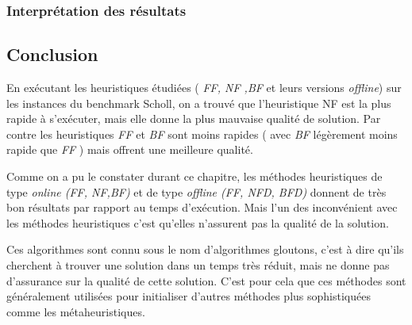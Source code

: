 \documentclass[class=article, crop=false]{standalone}
\begin{document}
\subsubsection{Interprétation des résultats}

\subsection{Conclusion}
En exécutant les heuristiques étudiées ( \emph{FF, NF ,BF} et leurs versions \emph{offline}) sur les instances du benchmark Scholl, on a trouvé que l’heuristique NF est la plus rapide à s’exécuter, mais elle donne la plus mauvaise qualité de solution. Par contre les heuristiques \emph{FF} et \emph{BF} sont moins rapides ( avec \emph{BF} légèrement moins rapide que \emph{FF} )  mais offrent une meilleure qualité.  

Comme on a pu le constater durant ce chapitre, les méthodes heuristiques de type \emph{online (FF, NF,BF)} et de type \emph{offline (FF, NFD, BFD)} donnent de très bon résultats par rapport au temps d’exécution. Mais l’un des inconvénient avec les méthodes heuristiques c’est qu’elles n'assurent pas la qualité de la solution.

Ces algorithmes sont connu sous le nom d’algorithmes gloutons, c’est à dire qu’ils cherchent à trouver une solution dans un temps très réduit, mais ne donne pas d’assurance sur la qualité de cette solution. C’est pour cela que ces méthodes sont généralement utilisées pour initialiser d’autres méthodes plus sophistiquées comme les métaheuristiques.
\end{document}
